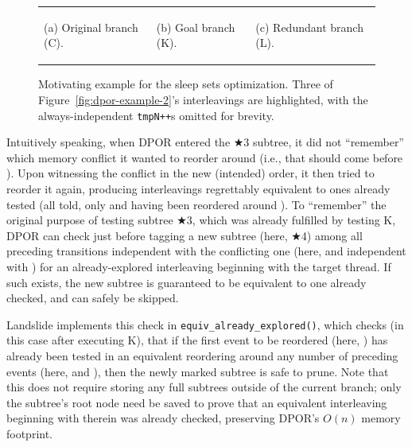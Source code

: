 \begin{figure}[h]
\begin{center}
\begin{tabular}{p{}p{}p{}}
\begin{center}
	(a) Original branch (C).
	\end{center}
	&
	\begin{center}
	(b) Goal branch (K).
	\end{center}
	&
	\begin{center}
	(c) Redundant branch (L).
	\end{center}
	\end{tabular}
	\end{center}
	\caption{Motivating example for the sleep sets optimization.
	Three of Figure~\ref{fig:dpor-example-2}'s interleavings are highlighted,
	with the always-independent {\tt tmpN++}s omitted for brevity.
	}
	\label{fig:sleepsets}
\end{figure}

Intuitively speaking,
when DPOR entered the $\bigstar$3 subtree,
it did not ``remember'' which memory conflict it wanted to reorder  around
(i.e., that  should come before ).
Upon witnessing the conflict in the new (intended) order,
it then tried to reorder it again,
producing interleavings regrettably equivalent to ones already tested
(all told, only  and  having been reordered around ).
%
To ``remember'' the original purpose of testing subtree $\bigstar$3,
which was already fulfilled by testing K,
DPOR can check just before tagging a new subtree (here, $\bigstar$4)
among all preceding transitions independent with the conflicting one
(here,  and  independent with )
for an already-explored interleaving beginning with the target thread.
If such exists,
the new subtree is guaranteed to be equivalent to one already checked,
and can safely be skipped.

Landslide implements this check in {\tt equiv\_already\_explored()},
which checks (in this case after executing K),
that if the first event to be reordered (here, )
has already been tested in an equivalent reordering around any number of preceding events
(here,  and ),
then the newly marked subtree is safe to prune.
Note that this does not require storing any full subtrees outside of the current branch;
only the subtree's root node need be saved to
prove that an equivalent interleaving beginning with  therein was already checked,
preserving DPOR's $O(n)$ memory footprint.

